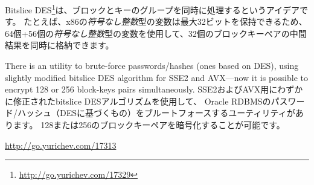 \label{bitslicedes}
\newcommand{\URLBS}{\url{http://go.yurichev.com/17329}}

Bitslice DES\footnote{\URLBS}は、ブロックとキーのグループを同時に処理するというアイデアです。
たとえば、x86の\emph{符号なし整数}型の変数は最大32ビットを保持できるため、
64個+56個の\emph{符号なし整数}型の変数を使用して、32個のブロックキーペアの中間結果を同時に格納できます。

\myindex{\oracle}
There is an utility to brute-force \oracle passwords/hashes (ones based on DES),
using slightly modified bitslice DES algorithm for SSE2 and AVX---now it is possible to encrypt 128 
or 256 block-keys pairs simultaneously.
SSE2およびAVX用にわずかに修正されたbitslice DESアルゴリズムを使用して、
Oracle RDBMSのパスワード/ハッシュ（DESに基づくもの）をブルートフォースするユーティリティがあります。
128または256のブロックキーペアを暗号化することが可能です。

\url{http://go.yurichev.com/17313}




